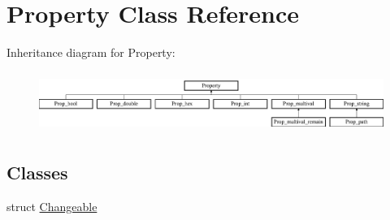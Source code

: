 \hypertarget{classProperty}{\section{Property Class Reference}
\label{classProperty}
}
Inheritance diagram for Property\-:\begin{figure}[H]
\begin{center}
\leavevmode
\includegraphics[height=1.985816cm]{classProperty}
\end{center}
\end{figure}
\subsection*{Classes}
\begin{DoxyCompactItemize}
\item 
struct \hyperlink{structProperty_1_1Changeable}{Changeable}
\end{DoxyCompactItemize}
